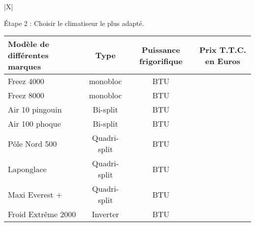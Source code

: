 \begin{enumerate}
\begin{center}
\begin{tabularx}{\linewidth}{|X|}
\medskip

Étape 2 : Choisir le climatiseur le plus adapté.\\[4pt]

\begin{center}
\begin{tabular}{|m{3cm}|*{3}{>{\centering \arraybackslash}c|}}\hline
Modèle de différentes 
marques				&Type			& Puissance frigorifique&Prix T.T.C. en Euros\\ \hline
Freez 4000 			&monobloc 		&\np{15000} BTU &880\\ \hline
Freez 8000 			&monobloc 		&\np{22000} BTU &\np{1050}\\ \hline
Air 10 pingouin 	&Bi-split 		&\np{27000} BTU &990\\ \hline
Air 100 phoque 		&Bi-split 		&\np{39000} BTU &\np{1390}\\ \hline
Pôle Nord 500 		&Quadri-split	&\np{48000} BTU &\np{1180}\\ \hline
Laponglace			&Quadri-split 	&\np{50000} BTU &\np{2300}\\ \hline
Maxi Everest $+$	&Quadri-split 	&\np{53000} BTU &\np{1990}\\ \hline
Froid Extrême 2000	&Inverter 		&\np{55000} BTU &\np{2650}\\ \hline
\end{tabular}
\end{center}\\ \hline
\end{tabularx}
\end{center}
\end{enumerate}


